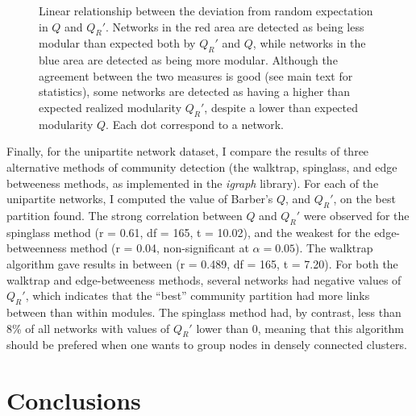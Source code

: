 \documentclass[12pt,oneside]{article}
\begin{document}
\begin{figure}[tbp]
\begin{center}
\end{center}
\caption{Linear relationship between the deviation from random expectation in $Q$ and $Q_R'$. Networks in the red area are detected as being less modular than expected both by $Q_R'$ and $Q$, while networks in the blue area are detected as being more modular. Although the agreement between the two measures is good (see main text for statistics), some networks are detected as having a higher than expected realized modularity $Q_R'$, despite a lower than expected modularity $Q$. Each dot correspond to a network.}
\label{f:dnull}
\end{figure}

Finally, for the unipartite network dataset, I compare the results of three
alternative methods of community detection (the walktrap, spinglass, and edge
betweeness methods, as implemented in the \emph{igraph} library). For each of
the unipartite networks, I computed the value of Barber's $Q$, and $Q_R'$, on
the best partition found. The strong correlation between $Q$ and $Q_R'$ were
observed for the spinglass method (r = 0.61, df = 165, t = 10.02), and the
weakest for the edge-betweenness method (r = 0.04, non-significant at $\alpha =
0.05$). The walktrap algorithm gave results in between (r = 0.489, df = 165, t
= 7.20). For both the walktrap and edge-betweeness methods, several networks
had negative values of $Q_R'$, which indicates that the ``best'' community
partition had more links between than within modules. The spinglass method had,
by contrast, less than 8\% of all networks with values of $Q_R'$ lower than 0,
meaning that this algorithm should be prefered when one wants to group nodes in
densely connected clusters.

\section{Conclusions}
\end{document}
